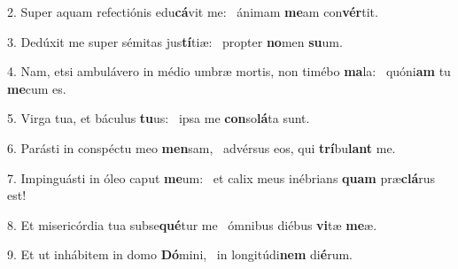 2. Super aquam refectiónis edu\textbf{cá}vit me: \ast\  ánimam \textbf{me}am con\textbf{vér}tit.\

3. Dedúxit me super sémitas jus\textbf{tí}tiæ: \ast\  propter \textbf{no}men \textbf{su}um.\

4. Nam, etsi ambulávero in médio umbræ mortis, non timébo \textbf{ma}la: \ast\  quóni\textbf{am} tu \textbf{me}cum es.\

5. Virga tua, et báculus \textbf{tu}us: \ast\  ipsa me \textbf{con}so\textbf{lá}ta sunt.\

6. Parásti in conspéctu meo \textbf{men}sam, \ast\  advérsus eos, qui \textbf{trí}bu\textbf{lant} me.\

7. Impinguásti in óleo caput \textbf{me}um: \ast\  et calix meus inébrians \textbf{quam} præ\textbf{clá}rus est!\

8. Et misericórdia tua subse\textbf{qué}tur me \ast\  ómnibus diébus \textbf{vi}tæ \textbf{me}æ.\

9. Et ut inhábitem in domo \textbf{Dó}mini, \ast\  in longitúdi\textbf{nem} di\textbf{é}rum.\

